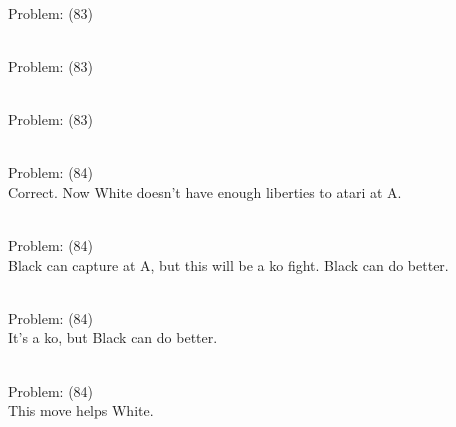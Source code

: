 \documentclass[11pt]{article}
\begin{document}
\begin{minipage}[t]{0.5\textwidth}
  {\centering
  
\\
Problem: (83)\\
  }
\end{minipage}
\begin{minipage}[t]{0.5\textwidth}
  {\centering
  
\\
Problem: (83)\\
  }
\end{minipage}
\begin{minipage}[t]{0.5\textwidth}
  {\centering
  
\\
Problem: (83)\\
  }
\end{minipage}
\begin{minipage}[t]{0.5\textwidth}
  {\centering
  
\\
Problem: (84)\\
Correct. Now White doesn't have enough liberties to atari at A.\\
  }
\end{minipage}
\begin{minipage}[t]{0.5\textwidth}
  {\centering
  
\\
Problem: (84)\\
Black can capture at A, but this will be a ko fight. Black can do better.\\
  }
\end{minipage}
\begin{minipage}[t]{0.5\textwidth}
  {\centering
  
\\
Problem: (84)\\
It's a ko, but Black can do better.\\
  }
\end{minipage}
\begin{minipage}[t]{0.5\textwidth}
  {\centering
  
\\
Problem: (84)\\
This move helps White.\\
  }
\end{minipage}
\end{document}
